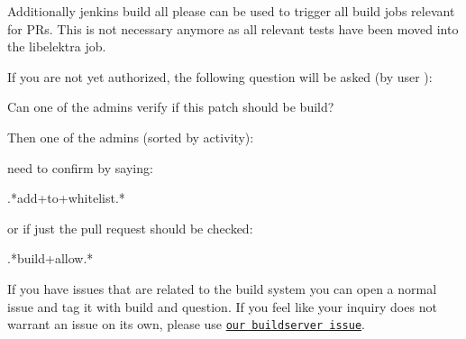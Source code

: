 Additionally {\ttfamily jenkins build all please} can be used to trigger all build jobs relevant for PR\textquotesingle{}s. This is not necessary anymore as all relevant tests have been moved into the libelektra job.

If you are not yet authorized, the following question will be asked (by user )\+: \begin{DoxyVerb}Can one of the admins verify if this patch should be build?
\end{DoxyVerb}


Then one of the admins (sorted by activity)\+:


\begin{DoxyItemize}
\item 
\item 
\item 
\item 
\item 
\item 
\end{DoxyItemize}

need to confirm by saying\+: \begin{DoxyVerb}.*add\W+to\W+whitelist.*
\end{DoxyVerb}


or if just the pull request should be checked\+: \begin{DoxyVerb}.*build\W+allow.*
\end{DoxyVerb}


If you have issues that are related to the build system you can open a normal issue and tag it with {\ttfamily build} and {\ttfamily question}. If you feel like your inquiry does not warrant an issue on its own, please use \href{https://issues.libelektra.org/160}{\tt our buildserver issue}. 